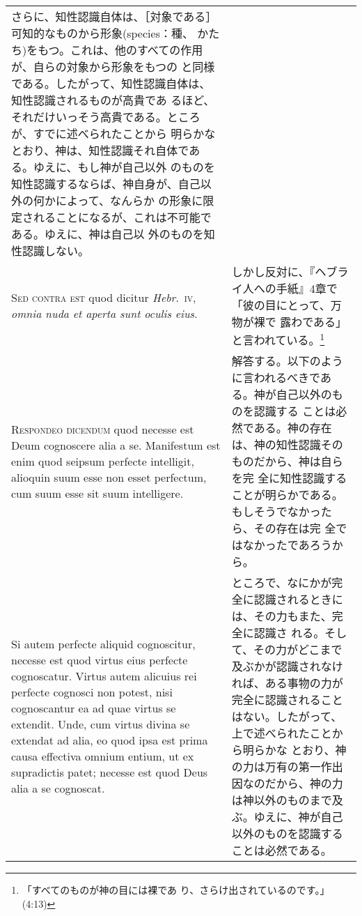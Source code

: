 \documentclass[10pt]{jsarticle} %
\begin{document}
\begin{longtable}{p{21em}p{21em}}
さらに、知性認識自体は、［対象である］可知的なものから形象(species：種、
かたち)をもつ。これは、他のすべての作用が、自らの対象から形象をもつの
と同様である。したがって、知性認識自体は、知性認識されるものが高貴であ
るほど、それだけいっそう高貴である。ところが、すでに述べられたことから
明らかなとおり、神は、知性認識それ自体である。ゆえに、もし神が自己以外
のものを知性認識するならば、神自身が、自己以外の何かによって、なんらか
の形象に限定されることになるが、これは不可能である。ゆえに、神は自己以
外のものを知性認識しない。


\\


{\scshape Sed contra est} quod dicitur {\itshape Hebr}.~{\scshape iv},
{\itshape omnia nuda et aperta sunt oculis eius}.


&

しかし反対に、『ヘブライ人への手紙』4章で「彼の目にとって、万物が裸で
露わである」と言われている。\footnote{「すべてのものが神の目には裸であ
り、さらけ出されているのです。」(4:13)}

\\


{\scshape Respondeo dicendum} quod necesse est Deum cognoscere alia a
se. Manifestum est enim quod seipsum perfecte intelligit, alioquin
suum esse non esset perfectum, cum suum esse sit suum intelligere.


&

解答する。以下のように言われるべきである。神が自己以外のものを認識する
ことは必然である。神の存在は、神の知性認識そのものだから、神は自らを完
全に知性認識することが明らかである。もしそうでなかったら、その存在は完
全ではなかったであろうから。

\\

Si autem perfecte aliquid cognoscitur, necesse est quod virtus eius
perfecte cognoscatur.  Virtus autem alicuius rei perfecte cognosci non
potest, nisi cognoscantur ea ad quae virtus se extendit. Unde, cum
virtus divina se extendat ad alia, eo quod ipsa est prima causa
effectiva omnium entium, ut ex supradictis patet; necesse est quod
Deus alia a se cognoscat.


&

ところで、なにかが完全に認識されるときには、その力もまた、完全に認識さ
れる。そして、その力がどこまで及ぶかが認識されなければ、ある事物の力が
完全に認識されることはない。したがって、上で述べられたことから明らかな
とおり、神の力は万有の第一作出因なのだから、神の力は神以外のものまで及
ぶ。ゆえに、神が自己以外のものを認識することは必然である。



\end{longtable}
\end{document}
